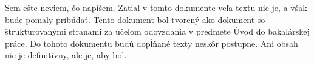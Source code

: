 {\color{red} Sem ešte neviem, čo napíšem. Zatiaľ v tomto dokumente veľa textu nie je, a však bude pomaly pribúdať. Tento dokument bol tvorený ako dokument so štrukturovanými stranami za účelom odovzdania v predmete Úvod do bakalárskej práce. Do tohoto dokumentu budú dopĺňané texty neskôr postupne. Ani obsah nie je definitívny, ale je, aby bol.}